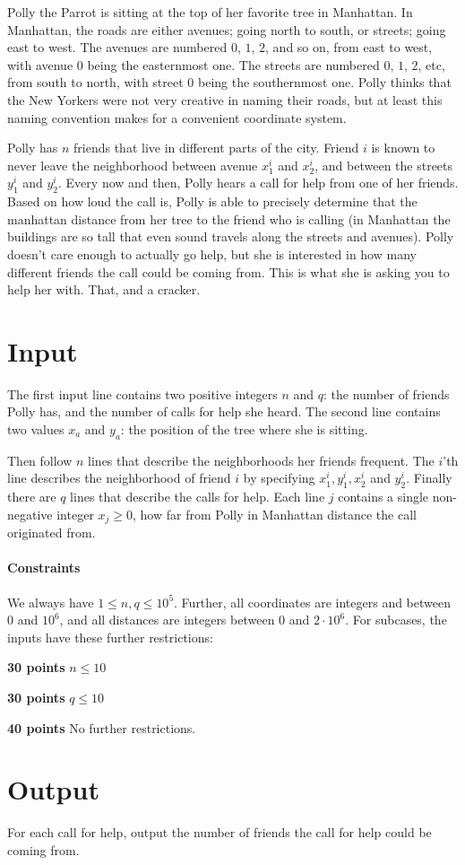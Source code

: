 
\noindent
Polly the Parrot is sitting at the top of her favorite tree in Manhattan. In Manhattan, the roads are either avenues; going north to south, or streets; going east to west. The avenues are numbered $0$, $1$, $2$, and so on, from east to west, with avenue $0$ being the easternmost one. The streets are numbered  $0$, $1$, $2$, etc, from south to north, with street $0$ being the southernmost one. Polly thinks that the New Yorkers were not very creative in naming their roads, but at least this naming convention makes for a convenient coordinate system. 

Polly has $n$ friends that live in different parts of the city. Friend $i$ is known to never leave the neighborhood between avenue $x_1^i$ and $x_2^i$, and between the streets $y_1^i$ and $y_2^i$. Every now and then, Polly hears a call for help from one of her friends. Based on how loud the call is, Polly is able to precisely determine that the manhattan distance from her tree to the friend who is calling (in Manhattan the buildings are so tall that even sound travels along the streets and avenues). Polly doesn't care enough to actually go help, but she is interested in how many different friends the call could be coming from. This is what she is asking you to help her with. That, and a cracker. 

\section*{Input}

The first input line contains two positive integers $n$ and $q$: the number of friends Polly has, and the number of calls for help she heard. The second line contains two values $x_a$ and $y_a$: the position of the tree where she is sitting.

Then follow $n$ lines that describe the neighborhoods her friends frequent. The $i$'th line describes the neighborhood of friend $i$ by specifying $x_1^i, y_1^i, x_2^i$ and $y_2^i$. Finally there are $q$ lines that describe the calls for help. Each line $j$ contains a single non-negative integer $x_j \geq 0$, how far from Polly in Manhattan distance the call originated from. 

\paragraph*{Constraints}
We always have $1 \leq n, q \leq 10^5$. Further, all coordinates are integers and between $0$ and $10^6$, and all distances are integers between $0$ and $2\cdot 10^6$.  For subcases, the inputs have these further restrictions:

\begin{description}
    \item{\textbf{30 points}} $n \leq 10$
    \item{\textbf{30 points}} $q \leq 10$ 
    \item{\textbf{40 points}} No further restrictions.
\end{description}


\section*{Output}
For each call for help, output the number of friends the call for help could be coming from.
